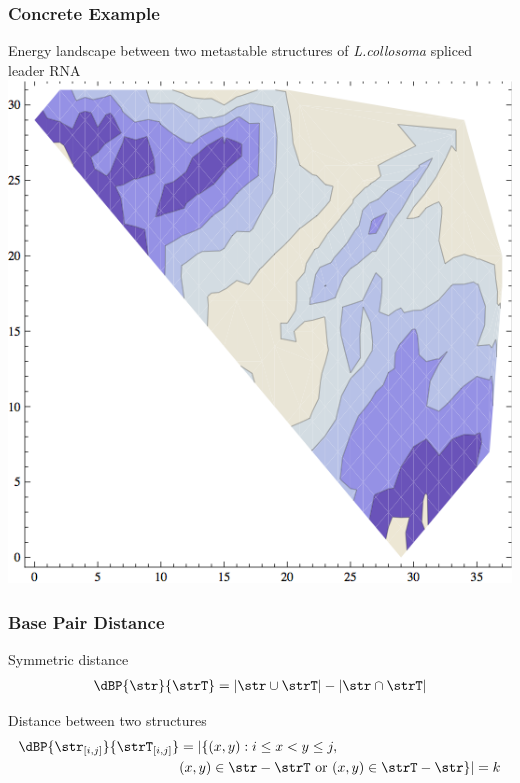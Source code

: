 \documentclass{beamer}
\begin{document}
\begin{frame}
  \frametitle{Concrete Example}
  \begin{block}{Energy landscape between two metastable structures of {\em L.collosoma} spliced leader RNA}
  \vspace{1em}
  \centering\includegraphics[scale=.5]{2dgrid.png}
  \end{block}
\end{frame}

\begin{frame}
  \frametitle{Base Pair Distance}
  \begin{block}{Symmetric distance}
  \begin{align*}
    \dBP{\str}{\strT} = |\str \cup \strT| - |\str \cap \strT|
  \end{align*}
  \end{block}

  \begin{block}{Distance between two structures}
  \begin{align*}
  \begin{split}
    \dBP{\str_{[i,j]}}{\strT_{[i,j]}} &=
  |\{ (x,y): i \leq x<y\leq j, \\
  & (x,y) \in \str - \strT \text{ or } (x,y) \in \strT - \str \}| = k
  \end{split}
  \end{align*}
  \end{block}
\end{frame}
\end{document}

